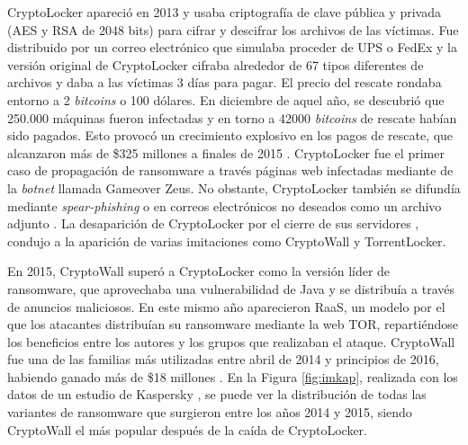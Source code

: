 
CryptoLocker apareció en 2013 y usaba criptografía de clave pública y privada (\gls{AES} y \gls{RSA} de 2048 bits) para cifrar y descifrar los archivos de las víctimas. Fue distribuido por un correo electrónico que simulaba proceder de UPS o FedEx y la versión original de CryptoLocker cifraba alrededor de 67 tipos diferentes de archivos y daba a las víctimas 3 días para pagar. El precio del rescate rondaba entorno a 2 \textit{bitcoins} o 100 dólares. En diciembre de aquel año, se descubrió que 250.000 máquinas fueron infectadas y en torno a 42000 \textit{bitcoins} de rescate habían sido pagados.
Esto provocó un crecimiento explosivo en los pagos de rescate, que alcanzaron más de \$325 millones a finales de 2015 \cite{8}. CryptoLocker fue el primer caso de propagación de ransomware a través páginas web infectadas mediante de la \textit{botnet} llamada Gameover Zeus. No obstante, CryptoLocker también se difundía mediante \textit{spear-phishing} o en correos electrónicos no deseados como un archivo adjunto \cite{55}. La desaparición de CryptoLocker por el cierre de sus servidores \cite{cryptoLock}, condujo a la aparición de varias imitaciones como CryptoWall y TorrentLocker. 

En 2015, CryptoWall superó a CryptoLocker como la versión líder de ransomware, que aprovechaba una vulnerabilidad de Java y se distribuía a través de anuncios maliciosos. En este mismo año aparecieron \gls{RaaS}, un modelo por el que los atacantes distribuían su ransomware mediante la web \gls{TOR}, repartiéndose los beneficios entre los autores y los grupos que realizaban el ataque. CryptoWall fue una de las familias más utilizadas entre abril de 2014 y principios de 2016, habiendo ganado más de \$18 millones \cite{52}. En la Figura \ref{fig:imkap}, realizada con los datos de un estudio de Kaspersky \cite{40}, se puede ver la distribución de todas las variantes de ransomware que surgieron entre los años 2014 y 2015, siendo CryptoWall el más popular después de la caída de CryptoLocker.

\newpage

